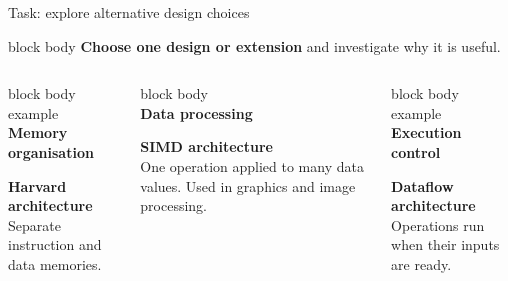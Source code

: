 \documentclass[aspectratio=169,10pt]{beamer}
\begin{document}
\begin{frame}{Task: explore alternative design choices}
  \begin{beamercolorbox}[rounded=true,sep=0.16cm,wd=\textwidth]{block body}
    \centering\small
    \textbf{Choose one design or extension} and investigate why it is useful.
  \end{beamercolorbox}
  \vspace{0.14cm}
  \begin{columns}[T,onlytextwidth]
      \begin{beamercolorbox}[rounded=true,sep=0.11cm,wd=\linewidth]{block body example}
        \centering\small\textcolor{nInk}{\large\faDatabase}\\[-1mm]
        \textbf{Memory organisation}\\[0.04cm]
        \raggedright\footnotesize
        \textbf{Harvard architecture}\\
        Separate instruction and data memories.
      \end{beamercolorbox}
      \begin{beamercolorbox}[rounded=true,sep=0.11cm,wd=\linewidth]{block body}
        \centering\small\textcolor{nInk}{\large\faCalculator}\\[-1mm]
        \textbf{Data processing}\\[0.04cm]
        \raggedright\footnotesize
        \textbf{SIMD architecture}\\
        One operation applied to many data values.
        Used in graphics and image processing.
      \end{beamercolorbox}
      \begin{beamercolorbox}[rounded=true,sep=0.11cm,wd=\linewidth]{block body example}
        \centering\small\textcolor{nInk}{\large\faCogs}\\[-1mm]
        \textbf{Execution control}\\[0.04cm]
        \raggedright\footnotesize
        \textbf{Dataflow architecture}\\
        Operations run when their inputs are ready.
      \end{beamercolorbox}
  \end{columns}


\end{frame}
\end{document}
